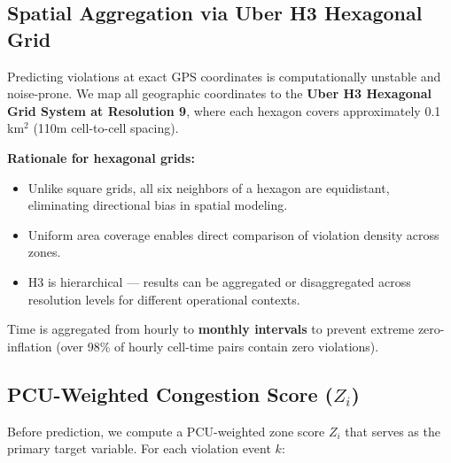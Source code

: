 \documentclass[12pt,a4paper]{article}
\begin{document}
\subsection{Spatial Aggregation via Uber H3 Hexagonal Grid}

Predicting violations at exact GPS coordinates is computationally unstable and noise-prone. We map all geographic coordinates to the \textbf{Uber H3 Hexagonal Grid System at Resolution 9}, where each hexagon covers approximately 0.1 km$^2$ (110m cell-to-cell spacing).

\textbf{Rationale for hexagonal grids:}
\begin{itemize}
    \item Unlike square grids, all six neighbors of a hexagon are equidistant, eliminating directional bias in spatial modeling.
    \item Uniform area coverage enables direct comparison of violation density across zones.
    \item H3 is hierarchical — results can be aggregated or disaggregated across resolution levels for different operational contexts.
\end{itemize}

Time is aggregated from hourly to \textbf{monthly intervals} to prevent extreme zero-inflation (over 98\% of hourly cell-time pairs contain zero violations).

\subsection{PCU-Weighted Congestion Score ($Z_i$)}

Before prediction, we compute a PCU-weighted zone score $Z_i$ that serves as the primary target variable. For each violation event $k$:
\end{document}

